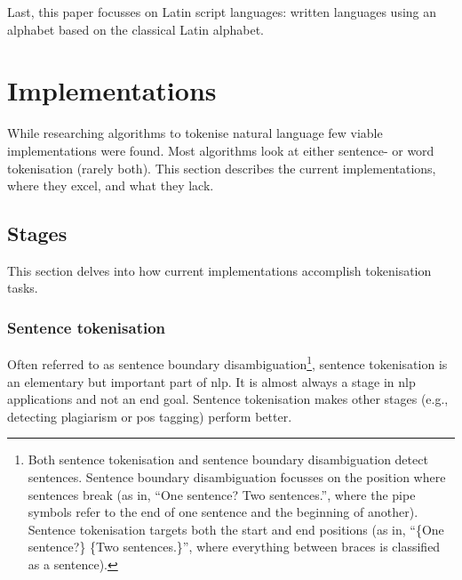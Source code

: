 Last, this paper focusses on Latin script languages: written languages
  using an alphabet based on the classical Latin alphabet.

\section{Implementations}\label{implementations}

While researching algorithms to tokenise natural language few viable
  implementations were found.
Most algorithms look at either sentence- or word tokenisation (rarely both).
This section describes the current implementations, where they excel, and
  what they lack.

\subsection{Stages}\label{stages}

This section delves into how current implementations accomplish
  tokenisation tasks.

\subsubsection{Sentence tokenisation}\label{sentence-tokenisation}

Often referred to as sentence boundary disambiguation\footnote{Both
    sentence tokenisation and sentence boundary disambiguation detect
      sentences.
    Sentence boundary disambiguation focusses on the position where
      sentences break (as in, ``One sentence?\textbar{} Two
      sentences.\textbar{}'', where the pipe symbols refer to the end of
      one sentence and the beginning of another). Sentence
      tokenisation targets both the start and end positions (as in,
      ``\{One sentence?\} \{Two sentences.\}'', where everything between
      braces is classified as a sentence).}, sentence
  tokenisation is an elementary but important part of \gls{nlp}.
It is almost always a stage in \gls{nlp} applications and not an end goal.
Sentence tokenisation makes other stages (e.g., detecting plagiarism or
  \gls{pos} tagging) perform better.

